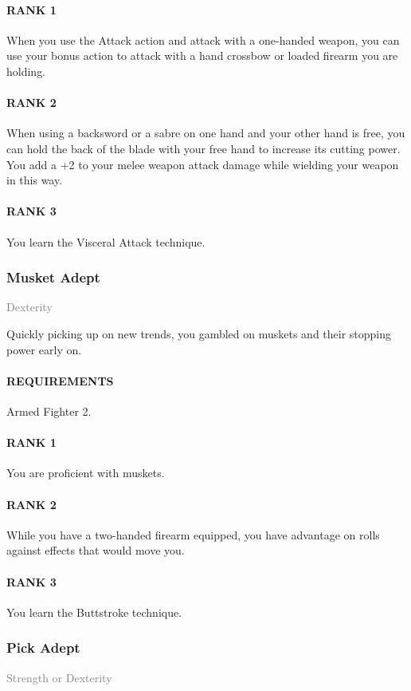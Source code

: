 \paragraph{RANK 1} When you use the Attack action and attack with a one-handed weapon, you can use your bonus action to attack with a hand crossbow or loaded firearm you are holding.
\paragraph{RANK 2} When using a backsword or a sabre on one hand and your other hand is free, you can hold the back of the blade with your free hand to increase its cutting power.
You add a +2 to your melee weapon attack damage while wielding your weapon in this way.
\paragraph{RANK 3} You learn the Visceral Attack technique.

\subsubsection{Musket Adept} \label{feat::musketadept}
\small{\textcolor{gray}{Dexterity}}

\normalsize
Quickly picking up on new trends, you gambled on muskets and their stopping power early on.
\paragraph{REQUIREMENTS} Armed Fighter 2.
\paragraph{RANK 1} You are proficient with muskets.
\paragraph{RANK 2} While you have a two-handed firearm equipped, you have advantage on rolls against effects that would move you.
\paragraph{RANK 3} You learn the Buttstroke technique.

\subsubsection{Pick Adept} \label{feat::pickadept}
\small{\textcolor{gray}{Strength or Dexterity}}

